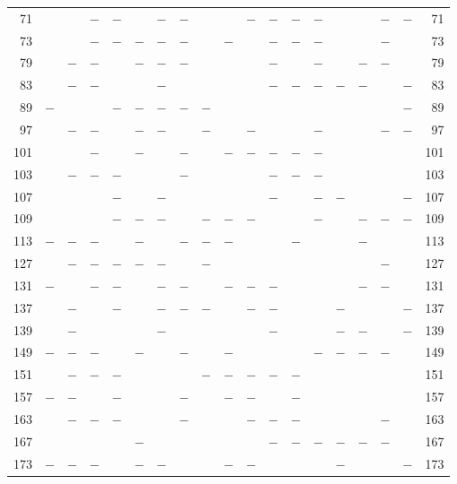 \begin{center}
\begin{tabular}{r|c|c|c|c|c|c|c|c|c|c|c|c|c|c|c|c|c|r}
71 &  &  & $-$ & $-$ &  & $-$ & $-$ &  &  & $-$ & $-$ & $-$ & $-$ &  &  & $-$ & $-$ & 71\\
73 &  &  & $-$ & $-$ & $-$ & $-$ & $-$ &  & $-$ &  & $-$ & $-$ & $-$ &  &  & $-$ &  & 73\\
79 &  & $-$ & $-$ &  & $-$ & $-$ & $-$ &  &  &  & $-$ &  & $-$ &  & $-$ & $-$ &  & 79\\
83 &  & $-$ & $-$ &  &  & $-$ &  &  &  &  & $-$ & $-$ & $-$ & $-$ & $-$ &  & $-$ & 83\\
89 & $-$ &  &  & $-$ & $-$ & $-$ & $-$ & $-$ &  &  &  &  &  &  &  &  & $-$ & 89\\
97 &  & $-$ & $-$ &  & $-$ & $-$ &  & $-$ &  & $-$ &  &  & $-$ &  &  & $-$ & $-$ & 97\\
101 &  &  & $-$ &  & $-$ &  & $-$ &  & $-$ & $-$ & $-$ & $-$ & $-$ &  &  &  &  & 101\\
103 &  & $-$ & $-$ & $-$ &  &  & $-$ &  &  &  & $-$ & $-$ & $-$ &  &  &  &  & 103\\
107 &  &  &  & $-$ &  & $-$ &  &  &  &  & $-$ &  & $-$ & $-$ &  &  & $-$ & 107\\
109 &  &  &  & $-$ & $-$ & $-$ &  & $-$ & $-$ & $-$ &  &  & $-$ &  & $-$ & $-$ & $-$ & 109\\
113 & $-$ & $-$ & $-$ &  & $-$ &  & $-$ & $-$ & $-$ &  &  & $-$ &  &  & $-$ &  &  & 113\\
127 &  & $-$ & $-$ & $-$ & $-$ & $-$ &  & $-$ &  &  &  &  &  &  &  & $-$ &  & 127\\
131 & $-$ &  & $-$ & $-$ &  & $-$ & $-$ &  & $-$ & $-$ & $-$ &  &  &  & $-$ & $-$ &  & 131\\
137 &  & $-$ &  & $-$ &  & $-$ & $-$ & $-$ &  & $-$ & $-$ &  &  & $-$ &  &  & $-$ & 137\\
139 &  & $-$ &  &  &  & $-$ &  &  &  &  & $-$ &  &  & $-$ & $-$ &  & $-$ & 139\\
149 & $-$ & $-$ & $-$ &  & $-$ &  & $-$ &  & $-$ &  &  &  & $-$ & $-$ & $-$ & $-$ &  & 149\\
151 &  & $-$ & $-$ & $-$ &  &  &  & $-$ & $-$ & $-$ & $-$ & $-$ &  &  &  &  &  & 151\\
157 & $-$ & $-$ &  & $-$ &  &  & $-$ &  & $-$ & $-$ &  & $-$ &  &  &  &  &  & 157\\
163 &  & $-$ & $-$ & $-$ &  &  & $-$ &  &  & $-$ & $-$ & $-$ &  &  &  & $-$ &  & 163\\
167 &  &  &  &  & $-$ &  &  &  &  &  & $-$ & $-$ & $-$ & $-$ & $-$ & $-$ &  & 167\\
173 & $-$ & $-$ & $-$ &  & $-$ & $-$ &  &  & $-$ & $-$ &  &  &  & $-$ &  &  & $-$ & 173\\

\end{tabular}
\end{center}
